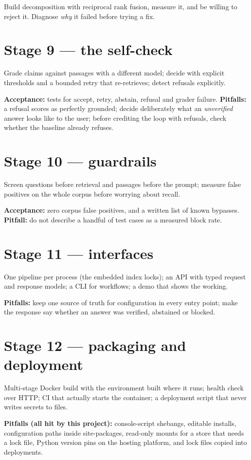 Build decomposition with reciprocal rank fusion, measure it, and be willing to reject it. Diagnose \emph{why} it failed before trying a fix.

\section{Stage 9 --- the self-check}

Grade claims against passages with a different model; decide with explicit thresholds and a bounded retry that re-retrieves; detect refusals explicitly.

\textbf{Acceptance:} tests for accept, retry, abstain, refusal and grader failure. \textbf{Pitfalls:} a refusal scores as perfectly grounded; decide deliberately what an \emph{unverified} answer looks like to the user; before crediting the loop with refusals, check whether the baseline already refuses.

\section{Stage 10 --- guardrails}

Screen questions before retrieval and passages before the prompt; measure false positives on the whole corpus before worrying about recall.

\textbf{Acceptance:} zero corpus false positives, and a written list of known bypasses. \textbf{Pitfall:} do not describe a handful of test cases as a measured block rate.

\section{Stage 11 --- interfaces}

One pipeline per process (the embedded index locks); an API with typed request and response models; a CLI for workflows; a demo that shows the working.

\textbf{Pitfalls:} keep one source of truth for configuration in every entry point; make the response say whether an answer was verified, abstained or blocked.

\section{Stage 12 --- packaging and deployment}

Multi-stage Docker build with the environment built where it runs; health check over HTTP; CI that actually starts the container; a deployment script that never writes secrets to files.

\textbf{Pitfalls (all hit by this project):} console-script shebangs, editable installs, configuration paths inside site-packages, read-only mounts for a store that needs a lock file, Python version pins on the hosting platform, and lock files copied into deployments.
